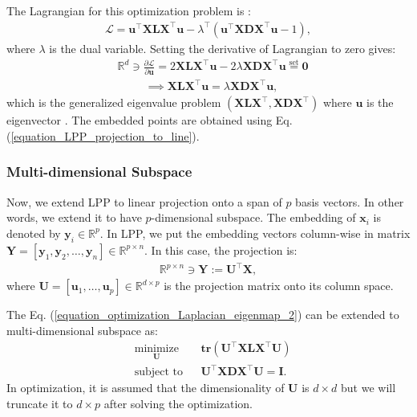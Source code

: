 \documentclass[lang=cn,10pt]{gorgeousnbook}
\numberwithin{equation}{section}%
\numberwithin{figure}{section}%
\begin{document}
The Lagrangian for this optimization problem is \cite{boyd2004convex}:
\begin{align*}
\mathcal{L} = \boldsymbol{u}^\top \boldsymbol{X} \boldsymbol{L} \boldsymbol{X}^\top \boldsymbol{u} - \lambda^\top (\boldsymbol{u}^\top \boldsymbol{X} \boldsymbol{D} \boldsymbol{X}^\top \boldsymbol{u} - 1),
\end{align*}
where $\lambda$ is the dual variable. Setting the derivative of Lagrangian to zero gives:
\begin{align}
&\mathbb{R}^{d} \ni \frac{\partial \mathcal{L}}{\partial \boldsymbol{u}} = 2 \boldsymbol{X} \boldsymbol{L} \boldsymbol{X}^\top \boldsymbol{u} - 2 \lambda \boldsymbol{X} \boldsymbol{D} \boldsymbol{X}^\top \boldsymbol{u} \overset{\text{set}}{=} \boldsymbol{0} \nonumber \\
&~~~~~~~~~~~ \implies \boldsymbol{X} \boldsymbol{L} \boldsymbol{X}^\top \boldsymbol{u} = \lambda \boldsymbol{X} \boldsymbol{D} \boldsymbol{X}^\top \boldsymbol{u},
\end{align}
which is the generalized eigenvalue problem $(\boldsymbol{X} \boldsymbol{L} \boldsymbol{X}^\top, \boldsymbol{X} \boldsymbol{D} \boldsymbol{X}^\top)$ where $\boldsymbol{u}$ is the eigenvector \cite{ghojogh2019eigenvalue}. The embedded points are obtained using Eq. (\ref{equation_LPP_projection_to_line}).

\subsubsection{Multi-dimensional Subspace}

Now, we extend LPP to linear projection onto a span of $p$ basis vectors. In other words, we extend it to have $p$-dimensional subspace.
The embedding of $\boldsymbol{x}_i$ is denoted by $\boldsymbol{y}_i \in \mathbb{R}^p$. In LPP, we put the embedding vectors column-wise in matrix $\boldsymbol{Y} = [\boldsymbol{y}_1, \boldsymbol{y}_2, \dots, \boldsymbol{y}_n] \in \mathbb{R}^{p \times n}$.
In this case, the projection is:
\begin{align}\label{equation_LPP_projection_to_subspace}
\mathbb{R}^{p \times n} \ni \boldsymbol{Y} := \boldsymbol{U}^\top \boldsymbol{X},
\end{align}
where $\boldsymbol{U} = [\boldsymbol{u}_1, \dots, \boldsymbol{u}_p] \in \mathbb{R}^{d \times p}$ is the projection matrix onto its column space. 

The Eq. (\ref{equation_optimization_Laplacian_eigenmap_2}) can be extended to multi-dimensional subspace as:
\begin{equation}\label{equation_optimization_Laplacian_eigenmap_2_multi}
\begin{aligned}
& \underset{\boldsymbol{U}}{\text{minimize}}
& & \textbf{tr}(\boldsymbol{U}^\top \boldsymbol{X} \boldsymbol{L} \boldsymbol{X}^\top \boldsymbol{U}) \\
& \text{subject to}
& & 
\boldsymbol{U}^\top \boldsymbol{X} \boldsymbol{D} \boldsymbol{X}^\top \boldsymbol{U} = \boldsymbol{I}.
\end{aligned}
\end{equation}
In optimization, it is assumed that the dimensionality of $\boldsymbol{U}$ is $d \times d$ but we will truncate it to $d \times p$ after solving the optimization. 
\end{document}
